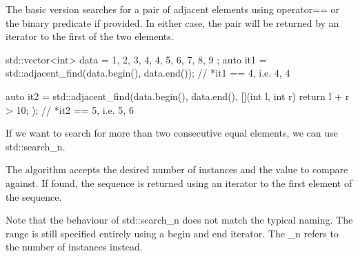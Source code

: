 

The basic version searches for a pair of adjacent elements using operator== or the binary predicate if provided. In either case, the pair will be returned by an iterator to the first of the two elements.

\begin{box-note}
\begin{cppcode}
std::vector<int> data = { 1, 2, 3, 4, 4, 5, 6, 7, 8, 9 };
auto it1 = std::adjacent_find(data.begin(), data.end());
// *it1 == 4, i.e. {4, 4}

auto it2 = std::adjacent_find(data.begin(), data.end(), 
                              [](int l, int r) { return l + r > 10; });
// *it2 == 5, i.e. {5, 6}
\end{cppcode}
\end{box-note}

If we want to search for more than two consecutive equal elements, we can use std::search\_n.



The algorithm accepts the desired number of instances and the value to compare against. If found, the sequence is returned using an iterator to the first element of the sequence.

\begin{box-note}
\end{box-note}

Note that the behaviour of std::search\_n does not match the typical naming. The range is still specified entirely using a begin and end iterator. The \_n refers to the number of instances instead.

